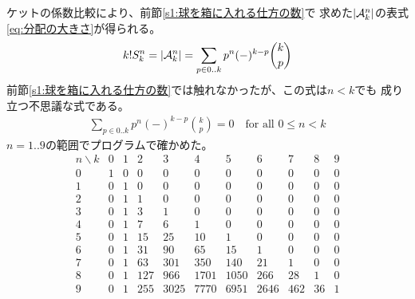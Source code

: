 	ケットの係数比較により、前節\ref{s1:球を箱に入れる仕方の数}で
	求めた$\left|{{\mathcal{A}}_k^n}\right|$の表式\eqref{eq:分配の大きさ}が得られる。
	\begin{equation*}\begin{split} %
		k!S_k^n = \zettai{\mycal{A}_k^n}
		= \sum_{p\in0..k}p^n(-)^{k-p}\binom{k}{p}
	\end{split}\end{equation*} %
	前節\ref{s1:球を箱に入れる仕方の数}では触れなかったが、この式は$n<k$でも
	成り立つ不思議な式である。
	\begin{equation*}\begin{split} %
		\sum_{p\in0..k}p^n(-)^{k-p}\binom{k}{p} = 0
		\quad\text{for all }0\le n< k
	\end{split}\end{equation*} %
	$n=1..9$の範囲でプログラムで確かめた。
	\begin{equation*}\begin{array}{r|rrrrrrrrrr} %
		n\backslash k & 0 & 1 & 2 & 3 & 4 & 5 & 6 & 7 & 8 & 9 \\ \hline
		0 & 1 & 0 & 0 & 0 & 0 & 0 & 0 & 0 & 0 & 0  \\
		1 & 0 & 1 & 0 & 0 & 0 & 0 & 0 & 0 & 0 & 0  \\
		2 & 0 & 1 & 1 & 0 & 0 & 0 & 0 & 0 & 0 & 0  \\
		3 & 0 & 1 & 3 & 1 & 0 & 0 & 0 & 0 & 0 & 0  \\
		4 & 0 & 1 & 7 & 6 & 1 & 0 & 0 & 0 & 0 & 0  \\
		5 & 0 & 1 & 15 & 25 & 10 & 1 & 0 & 0 & 0 & 0  \\
		6 & 0 & 1 & 31 & 90 & 65 & 15 & 1 & 0 & 0 & 0  \\
		7 & 0 & 1 & 63 & 301 & 350 & 140 & 21 & 1 & 0 & 0  \\
		8 & 0 & 1 & 127 & 966 & 1701 & 1050 & 266 & 28 & 1 & 0  \\
		9 & 0 & 1 & 255 & 3025 & 7770 & 6951 & 2646 & 462 & 36 & 1 \\
	\end{array}\end{equation*} %

